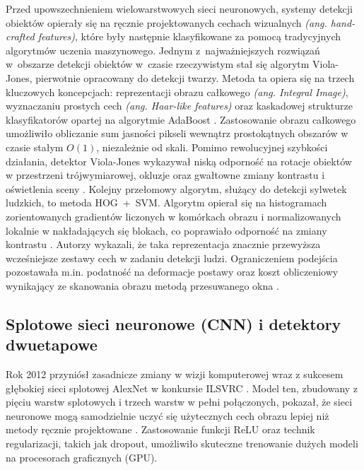 Przed upowszechnieniem wielowarstwowych sieci neuronowych, systemy detekcji obiektów opierały się
na ręcznie projektowanych cechach wizualnych \textit{(ang. hand-crafted features)}, które były
następnie klasyfikowane za pomocą tradycyjnych algorytmów uczenia maszynowego. Jednym
z~najważniejszych rozwiązań w~obszarze detekcji obiektów w~czasie rzeczywistym stał się algorytm
Viola-Jones, pierwotnie opracowany do detekcji twarzy. Metoda ta opiera się na trzech kluczowych
koncepcjach: reprezentacji obrazu całkowego \textit{(ang. Integral Image)}, wyznaczaniu prostych
cech \textit{(ang. Haar-like features)} oraz kaskadowej strukturze klasyfikatorów opartej na
algorytmie AdaBoost \cite{viola2001}. Zastosowanie obrazu całkowego umożliwiło obliczanie sum
jasności pikseli wewnątrz prostokątnych obszarów w czasie stałym $O(1)$, niezależnie od skali.
Pomimo rewolucyjnej szybkości działania, detektor Viola-Jones wykazywał niską odporność na rotacje
obiektów w przestrzeni trójwymiarowej, okluzje oraz gwałtowne zmiany kontrastu i oświetlenia sceny
\cite{viola2001}. Kolejny przełomowy algorytm, służący do detekcji sylwetek ludzkich, to metoda
HOG~+~SVM. Algorytm opierał się na histogramach zorientowanych gradientów liczonych w komórkach
obrazu i normalizowanych lokalnie w nakładających się blokach, co poprawiało odporność na zmiany
kontrastu \cite{dalal2005}. Autorzy wykazali, że taka reprezentacja znacznie przewyższa
wcześniejsze zestawy cech w zadaniu detekcji ludzi. Ograniczeniem podejścia pozostawała m.in.
podatność na deformacje postawy oraz koszt obliczeniowy wynikający ze skanowania obrazu metodą
przesuwanego okna \cite{dalal2005}.

\subsection{Splotowe sieci neuronowe (CNN) i detektory dwuetapowe}
Rok 2012 przyniósł zasadnicze zmiany w wizji komputerowej wraz z sukcesem głębokiej sieci splotowej
AlexNet w konkursie ILSVRC \cite{krizhevsky2012imagenet}. Model ten, zbudowany z pięciu warstw
splotowych i trzech warstw w pełni połączonych, pokazał, że sieci neuronowe mogą samodzielnie uczyć
się użytecznych cech obrazu lepiej niż metody ręcznie projektowane \cite{krizhevsky2012imagenet}.
Zastosowanie funkcji ReLU oraz technik regularizacji, takich jak dropout, umożliwiło skuteczne
trenowanie dużych modeli na procesorach graficznych (GPU).

